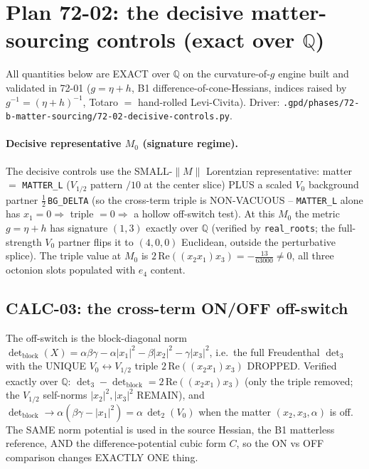 \section{Plan 72-02: the decisive matter-sourcing controls (exact over $\mathbb{Q}$)}
\label{sec:72-02-decisive}

All quantities below are EXACT over $\mathbb{Q}$ on the curvature-of-$g$ engine built
and validated in 72-01 ($g=\eta+h$, B1 difference-of-cone-Hessians, indices raised by
$g^{-1}=(\eta+h)^{-1}$, Totaro $=$ hand-rolled Levi-Civita). Driver:
\texttt{.gpd/phases/72-b-matter-sourcing/72-02-decisive-controls.py}.

\paragraph{Decisive representative $M_0$ (signature regime).} The decisive controls use
the SMALL-$\|M\|$ Lorentzian representative: matter $=$ \texttt{MATTER\_L} ($V_{1/2}$
pattern $/10$ at the center slice) PLUS a scaled $V_0$ background partner
$\tfrac12\,$\texttt{BG\_DELTA} (so the cross-term triple is NON-VACUOUS --
\texttt{MATTER\_L} alone has $x_1=0\Rightarrow$ triple $=0\Rightarrow$ a hollow
off-switch test). At this $M_0$ the metric $g=\eta+h$ has signature $(1,3)$ exactly over
$\mathbb{Q}$ (verified by \texttt{real\_roots}; the full-strength $V_0$ partner flips it
to $(4,0,0)$ Euclidean, outside the perturbative splice). The triple value at $M_0$ is
$2\,\mathrm{Re}((x_2x_1)x_3)=-\tfrac{13}{63000}\neq0$, all three octonion slots
populated with $e_4$ content.

\subsection{CALC-03: the cross-term ON/OFF off-switch}
\label{sec:onoff}

The off-switch is the block-diagonal norm $\det_{\mathrm{block}}(X)=\alpha\beta\gamma -
\alpha|x_1|^2 - \beta|x_2|^2 - \gamma|x_3|^2$, i.e.\ the full Freudenthal $\det_3$ with
the UNIQUE $V_0\!\leftrightarrow\!V_{1/2}$ triple $2\,\mathrm{Re}((x_2x_1)x_3)$ DROPPED.
Verified exactly over $\mathbb{Q}$: $\det_3 - \det_{\mathrm{block}} =
2\,\mathrm{Re}((x_2x_1)x_3)$ (only the triple removed; the $V_{1/2}$ self-norms
$|x_2|^2,|x_3|^2$ REMAIN), and $\det_{\mathrm{block}}\to\alpha(\beta\gamma-|x_1|^2)=
\alpha\,\det_2(V_0)$ when the matter $(x_2,x_3,\alpha)$ is off. The SAME norm potential is
used in the source Hessian, the B1 matterless reference, AND the difference-potential
cubic form $C$, so the ON vs OFF comparison changes EXACTLY ONE thing.

